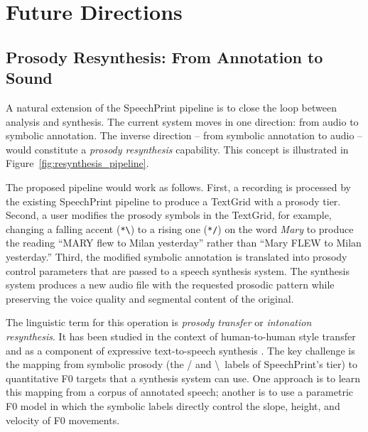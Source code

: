 \newpage




\section{Future Directions}
\label{sec:future}

\subsection{Prosody Resynthesis: From Annotation to Sound}
\label{sec:resynthesis}

A natural extension of the SpeechPrint pipeline is to close the loop between
analysis and synthesis. The current system moves in one direction: from audio
to symbolic annotation. The inverse direction -- from symbolic annotation to
audio -- would constitute a \emph{prosody resynthesis} capability. This concept
is illustrated in Figure~\ref{fig:resynthesis_pipeline}.

The proposed pipeline would work as follows. First, a recording is processed by
the existing SpeechPrint pipeline to produce a TextGrid with a prosody tier.
Second, a user modifies the prosody symbols in the TextGrid, for example,
changing a falling accent (\texttt{*\textbackslash}) to a rising one
(\texttt{*/}) on the word \textit{Mary} to produce the reading ``MARY flew to
Milan yesterday'' rather than ``Mary FLEW to Milan yesterday.'' Third, the
modified symbolic annotation is translated into prosody control parameters that
are passed to a speech synthesis system. The synthesis system produces a new
audio file with the requested prosodic pattern while preserving the voice quality
and segmental content of the original.

The linguistic term for this operation is \emph{prosody transfer} or
\emph{intonation resynthesis}. It has been studied in the context of
human-to-human style transfer and as a component of expressive text-to-speech
synthesis \cite{skerry2018towards}. The key challenge is the mapping from
symbolic prosody (the / and \textbackslash\ labels of SpeechPrint's tier) to
quantitative F0 targets that a synthesis system can use. One approach is to
learn this mapping from a corpus of annotated speech; another is to use a
parametric F0 model in which the symbolic labels directly control the slope,
height, and velocity of F0 movements.

